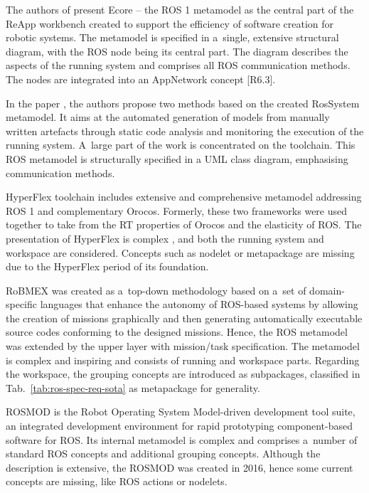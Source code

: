 \documentclass{ieeeaccess}
\begin{document}
	The authors of \cite{wenger2016model} present Ecore -- the ROS 1 metamodel as the central part of the ReApp workbench created to support the efficiency of software creation for robotic systems. The metamodel is specified in a~single, extensive structural diagram, with the ROS node being its central part. The diagram describes the aspects of the running system and comprises all ROS communication methods. The nodes are integrated into an AppNetwork concept [R6.3]. 
	
	In the paper \cite{garcia2019bootstrapping}, the authors propose two methods based on the created RosSystem metamodel. It aims at the automated generation of models from manually written artefacts through static code analysis and monitoring the execution of the running system. A~large part of the work is concentrated on the toolchain. This ROS metamodel is structurally specified in a UML class diagram, emphasising communication methods.
	
	HyperFlex toolchain \cite{brugali2016hyperflex,gherardi2013variability} includes extensive and comprehensive metamodel addressing ROS 1 and complementary Orocos. Formerly, these two frameworks were used together to take from the RT properties of Orocos and the elasticity of ROS. The presentation of HyperFlex is complex \cite{brugali2016hyperflex,gherardi2013variability}, and both the running system and workspace are considered. Concepts such as nodelet or metapackage are missing due to the HyperFlex period of its foundation.
	
	RoBMEX \cite{ladeira2021robmex} was created as a~top-down methodology based on a~set of domain-specific languages that enhance the autonomy of ROS-based systems by allowing the creation of missions graphically and then generating automatically executable source codes conforming to the designed missions. Hence, the ROS metamodel was extended by the upper layer with mission/task specification. The metamodel is complex and inspiring and consists of running and workspace parts. Regarding the workspace, the grouping concepts are introduced as subpackages, classified in Tab.~\ref{tab:ros-spec-req-sota} as metapackage for generality.
	
	ROSMOD \cite{kumar2016rosmod} is the Robot Operating System Model-driven development tool suite, an integrated development environment for rapid prototyping component-based
	software for ROS. Its internal metamodel is complex and comprises a~number of standard ROS concepts and additional grouping concepts. Although the description is extensive, the ROSMOD was created in 2016, hence some current concepts are missing, like ROS actions or nodelets.
	
\end{document}
